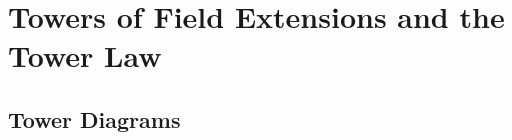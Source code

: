 \section{Towers of Field Extensions and the Tower Law}

\begin{hidden}
\end{hidden}

\subsection{Tower Diagrams}

